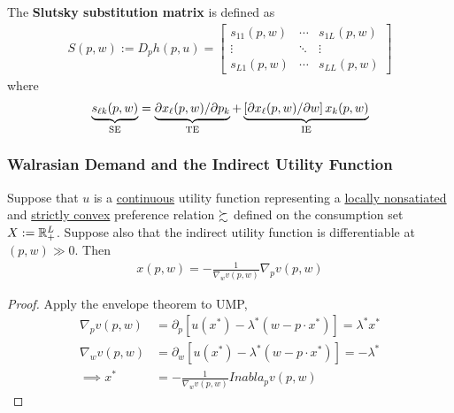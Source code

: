 \documentclass{article}
\begin{document}
 			\begin{definition}
 				The \textbf{Slutsky substitution matrix} is defined as
 				\begin{align}
 					S(p, w) := D_p h(p, u) = \left[ \begin{array}{ccc}{s_{11}(p, w)} & {\cdots} & {s_{1 L}(p, w)} \\ {\vdots} & {\ddots} & {\vdots} \\ {s_{L 1}(p, w)} & {\cdots} & {s_{L L}(p, w)}\end{array}\right]
 				\end{align}
 				where 
 				\begin{align}
 					\underbrace{s_{\ell k}(p, w)}_{\text{{SE}}}
 					=\underbrace{\partial x_{\ell}(p, w) / \partial p_{k}}_{\text{{TE}}}
 					+\underbrace{\left[\partial x_{\ell}(p, w) / \partial w\right] x_{k}(p, w)}_{\text{{IE}}}
 				\end{align}
 			\end{definition}
 			
 			\subsubsection{Walrasian Demand and the Indirect Utility Function}
 			
 			\begin{proposition}
 				Suppose that $u$ is a \ul{continuous} utility function representing a \ul{locally nonsatiated} and \ul{strictly convex} preference relation $\succsim$ defined on the consumption set $X := \mathbb{R}^L_+$. Suppose also that the indirect utility function is differentiable at $(p, w) \gg 0$. Then
 				\begin{align}
 					x(p, w)=-\frac{1}{\nabla_{w} v(p, w)} \nabla_{p} v(p, w)
 				\end{align}
 			\end{proposition}
 			
 			\begin{proof}
 				Apply the envelope theorem to UMP, 
 				\begin{align}
 					\nabla_p v(p, w) &= \partial_p [u(x^*) - \lambda^*(w - p \cdot x^*)] = \lambda^*x^* \\
 					\nabla_w v(p, w) &= \partial_w [u(x^*) - \lambda^*(w - p \cdot x^*)] = -\lambda^* \\
 					\implies x^* &= - \frac{1}{\nabla_w v(p, w)} Inabla_p v(p, w) 
 				\end{align}
 			\end{proof}
 			
\end{document}
